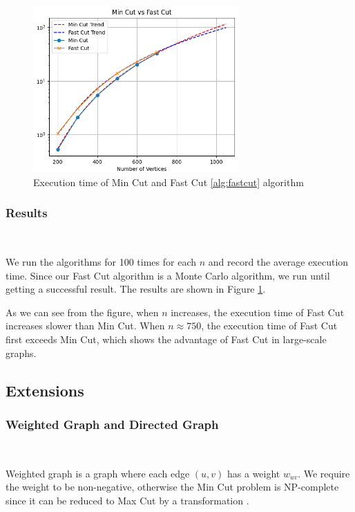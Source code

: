 \documentclass[11pt]{article}
\theoremstyle{plain}
\begin{document}
\begin{figure}[ht]
    \centering
    \includegraphics[width=0.7\textwidth]{../MinCut/MinCut.png}
    \caption{Execution time of Min Cut and Fast Cut \ref{alg:fastcut} algorithm}
    \label{fig:mc}
\end{figure}

\subsubsection{Results}\

We run the algorithms for 100 times for each $n$ and record the average execution time. Since our Fast Cut algorithm is a Monte Carlo algorithm, we run until getting a successful result.  The results are shown in Figure \ref{fig:mc}.

As we can see from the figure, when $n$ increases, the execution time of Fast Cut increases slower than Min Cut. When $n\approx 750$, the execution time of Fast Cut first exceeds Min Cut, which shows the advantage of Fast Cut in large-scale graphs.

\subsection{Extensions}
\subsubsection{Weighted Graph and Directed Graph}\

Weighted graph is a graph where each edge $(u,v)$ has a weight $w_{uv}$. We require the weight to be non-negative, otherwise the Min Cut problem is NP-complete since it can be reduced to Max Cut by a transformation \cite{garey1979computers}.
\end{document}
